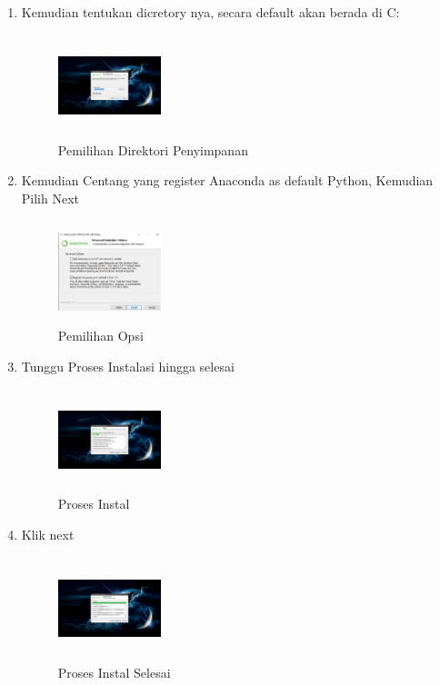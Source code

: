\begin{enumerate}
    \item Kemudian tentukan dicretory nya, secara default akan berada di C:\Users\namakomputer{}
    \begin{figure}[!htbp]
        \centering
        \includegraphics[width=3cm,height=3cm]{figures/Screenshot(83).png}
        \caption{Pemilihan Direktori Penyimpanan}
        \label{Directory}
        \end{figure}

    \item Kemudian Centang yang register Anaconda as default Python, Kemudian Pilih Next
    \begin{figure}[!htbp]
        \centering
        \includegraphics[width=3cm,height=3cm]{figures/Screenshot(84).jpeg}
        \caption{Pemilihan Opsi}
        \label{opsi}
        \end{figure}

    \item Tunggu Proses Instalasi hingga selesai
    \begin{figure}[!htbp]
        \centering
        \includegraphics[width=3cm,height=3cm]{figures/Screenshot(85).png}
        \caption{Proses Instal}
        \label{Proses}
        \end{figure}

    \item Klik next
    \begin{figure}[!htbp]
        \centering
        \includegraphics[width=3cm,height=3cm]{figures/Screenshot(86).png}
        \caption{Proses Instal Selesai}
        \label{Proses}
        \end{figure}


\end{enumerate}
